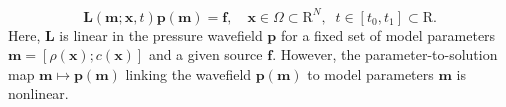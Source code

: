 \documentclass[12pt]{iopart}
\newcommand{\mathbb}[1]{\mathrm{#1}}
\begin{document}
\begin{equation}
	\mathbf{L}(\mathbf{m};\mathbf{x},t)\mathbf{p}(\mathbf{m})=\mathbf{f}, \quad
	\mathbf{x}\in\Omega\subset\mathbb{R}^N, \;\;t\in[t_0,t_1]\subset\mathbb{R}.
	\label{eq:forward_wave_equation_compact}
\end{equation}
Here, $\mathbf{L}$ is linear in the pressure wavefield $\mathbf{p}$ for a fixed set of model parameters $\mathbf{m}=[\rho(\mathbf{x});c(\mathbf{x})]$ and a given source $\mathbf{f}$. However, the parameter-to-solution map $\mathbf{m}\mapsto\mathbf{p}(\mathbf{m})$ linking the wavefield $\mathbf{p}(\mathbf{m})$ to model parameters $\mathbf{m}$ is nonlinear. 
 
\end{document}
